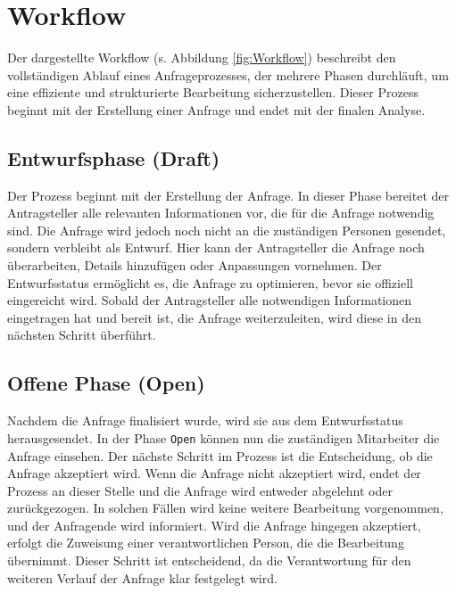 \section{Workflow}
Der dargestellte Workflow (s. Abbildung \ref{fig:Workflow}) beschreibt den vollständigen Ablauf eines Anfrageprozesses, der mehrere Phasen durchläuft, um eine effiziente und strukturierte Bearbeitung sicherzustellen. Dieser Prozess beginnt mit der Erstellung einer Anfrage und endet mit der finalen Analyse.
\subsection*{Entwurfsphase (Draft)}
Der Prozess beginnt mit der Erstellung der Anfrage. In dieser Phase bereitet der Antragsteller alle relevanten Informationen vor, die für die Anfrage notwendig sind. Die Anfrage wird jedoch noch nicht an die zuständigen Personen gesendet, sondern verbleibt als Entwurf. Hier kann der Antragsteller die Anfrage noch überarbeiten, Details hinzufügen oder Anpassungen vornehmen. Der Entwurfsstatus ermöglicht es, die Anfrage zu optimieren, bevor sie offiziell eingereicht wird. Sobald der Antragsteller alle notwendigen Informationen eingetragen hat und bereit ist, die Anfrage weiterzuleiten, wird diese in den nächsten Schritt überführt.
\subsection*{Offene Phase (Open)}
Nachdem die Anfrage finalisiert wurde, wird sie aus dem Entwurfsstatus herausgesendet. In der Phase \texttt{Open}  können nun die zuständigen Mitarbeiter die Anfrage einsehen.
\newline
Der nächste Schritt im Prozess ist die Entscheidung, ob die Anfrage akzeptiert wird. Wenn die Anfrage nicht akzeptiert wird, endet der Prozess an dieser Stelle und die Anfrage wird entweder abgelehnt oder zurückgezogen. In solchen Fällen wird keine weitere Bearbeitung vorgenommen, und der Anfragende wird informiert.
\newline
Wird die Anfrage hingegen akzeptiert, erfolgt die Zuweisung einer verantwortlichen Person, die die Bearbeitung übernimmt. Dieser Schritt ist entscheidend, da die Verantwortung für den weiteren Verlauf der Anfrage klar festgelegt wird.
